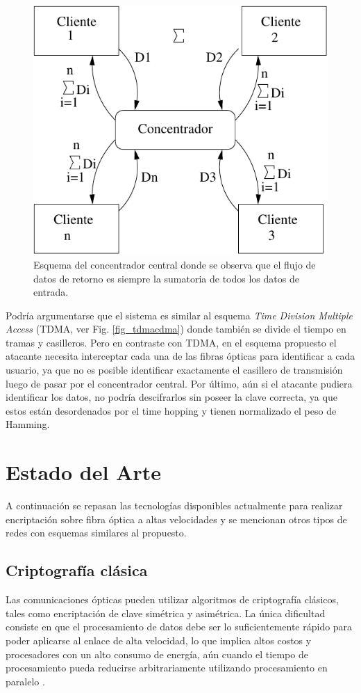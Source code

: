 \begin{figure}[t]
  \centering
  \includegraphics[width=0.5 \textwidth]{graphs/concentrador} 
  \caption{Esquema del concentrador central donde se observa que el flujo de datos de retorno es siempre la sumatoria de todos los datos de entrada.}
  \label{fig_use}
\end{figure}

Podría argumentarse que el sistema es similar al esquema \textit{Time Division Multiple Access} (TDMA, ver Fig. \ref{fig_tdmacdma}) donde también se divide el tiempo en tramas y casilleros. Pero en contraste con TDMA, en el esquema propuesto el atacante necesita interceptar cada una de las fibras ópticas para identificar a cada usuario, ya que no es posible identificar exactamente el casillero de transmisión luego de pasar por el concentrador central. Por último, aún si el atacante pudiera identificar los datos, no podría descifrarlos sin poseer la clave correcta, ya que estos están desordenados por el time hopping y tienen normalizado el peso de Hamming.


\section{Estado del Arte}

A continuación se repasan las tecnologías disponibles actualmente para realizar encriptación sobre fibra óptica a altas velocidades y se mencionan otros tipos de redes con esquemas similares al propuesto.

\subsection{Criptografía clásica}
Las comunicaciones ópticas pueden utilizar algoritmos de criptografía clásicos, tales como encriptación de clave simétrica y asimétrica. La única dificultad consiste en que el procesamiento de datos debe ser lo suficientemente rápido para poder aplicarse al enlace de alta velocidad, lo que implica altos costos y procesadores con un alto consumo de energía, aún cuando el tiempo de procesamiento pueda reducirse arbitrariamente utilizando procesamiento en paralelo \cite{liforward}.

